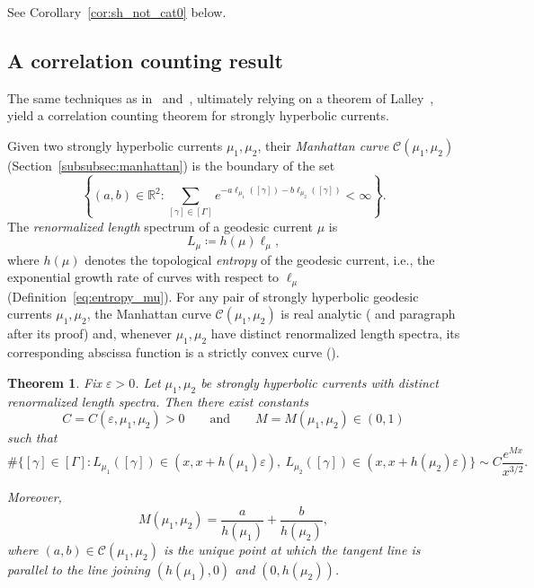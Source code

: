 \documentclass[12pt]{amsart}
\numberwithin{equation}{section}
\numberwithin{figure}{section}
\newtheorem{mainthm}{Theorem}
\theoremstyle{definition}
\theoremstyle{plain}
\begin{document}
See Corollary~\ref{cor:sh_not_cat0} below.

\subsection{A correlation counting result}

The same techniques as in~\cite{Sharp98:Hyperbolic} and~\cite{DM23:Correlation},
ultimately relying on a theorem of Lalley~\cite{Lalley97:AxiomA},
yield a correlation counting theorem for strongly hyperbolic currents.

Given two strongly hyperbolic currents $\mu_1,\mu_2$, their \emph{Manhattan curve}
$\mathcal C(\mu_1,\mu_2)$  (Section~\ref{subsubsec:manhattan}) is the boundary of the set
\[
\left\{
(a,b)\in\mathbb R^2:
\sum_{[\gamma]\in[\Gamma]}
e^{-a\ell_{\mu_1}([\gamma])-b\ell_{\mu_2}([\gamma])}
<
\infty
\right\}.
\]
The \emph{renormalized length} spectrum of a geodesic current $\mu$ is
\[
L_\mu\coloneqq h(\mu)\ell_\mu,
\]
where $h(\mu)$ denotes the topological \emph{entropy} of the geodesic current, i.e., the exponential growth rate of curves with respect to $\ell_\mu$ (Definition~\ref{eq:entropy_mu}).
For any pair of strongly hyperbolic geodesic currents $\mu_1,\mu_2$, the Manhattan curve $\mathcal C(\mu_1,\mu_2)$ is real analytic (\cite[Theorem~4.16]{CT25:Manhattan} and paragraph after its proof) and, whenever $\mu_1,\mu_2$ have distinct renormalized length spectra, its corresponding abscissa function is a strictly convex curve (\cite[Proposition~2.3]{CR25:Marked}).

\begin{mainthm}
\label{mainthm:counting}
Fix $\varepsilon>0$. Let $\mu_1,\mu_2$ be strongly hyperbolic currents with distinct renormalized length spectra. Then there exist constants
\[
C=C(\varepsilon,\mu_1,\mu_2)>0
\qquad\text{and}\qquad
M=M(\mu_1,\mu_2)\in(0,1)
\]
such that
\begin{equation}
\#\Big\{
[\gamma]\in[\Gamma]:
L_{\mu_1}([\gamma])
\in
(x,x+h(\mu_1)\varepsilon),
\
L_{\mu_2}([\gamma])
\in
(x,x+h(\mu_2)\varepsilon)
\Big\}
\sim
C\frac{e^{Mx}}{x^{3/2}}.
\label{eq:correlation}
\end{equation}

Moreover,
\begin{equation}
\label{eq:correlation_formula}
M(\mu_1,\mu_2)
=
\frac{a}{h(\mu_1)}
+
\frac{b}{h(\mu_2)},
\end{equation}
where $(a,b)\in\mathcal C(\mu_1,\mu_2)$ is the unique point at which the tangent line is parallel to the line joining $(h(\mu_1),0)$ and $(0,h(\mu_2))$.
\end{mainthm}
\end{document}
